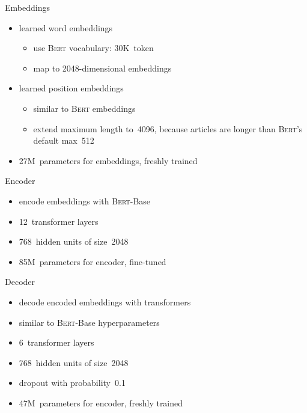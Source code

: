 \documentclass[english,handout]{mlutalk}
\newcommand{\Bert}{\textsc{Bert}\xspace}
\newcommand{\BertBase}{\textsc{Bert}-Base\xspace}
\begin{document}
\begin{frame}{Embeddings}
    \begin{itemize}
        \item learned word embeddings
        \begin{itemize}
            \item use \Bert vocabulary: 30K~token
            \item map to 2048-dimensional embeddings
        \end{itemize}
        \item learned position embeddings
        \begin{itemize}
            \item similar to \Bert embeddings
            \item extend maximum length to~4096, because articles are longer than \Bert's default max~512
        \end{itemize}
        \item 27M~parameters for embeddings, freshly trained
    \end{itemize}
\end{frame}

\begin{frame}{Encoder}
    \begin{itemize}
        \item encode embeddings with \BertBase~\cite{DevlinCLT2019}
        \item 12~transformer layers
        \item 768~hidden units of size~2048
        \item 85M~parameters for encoder, fine-tuned
    \end{itemize}
\end{frame}

\begin{frame}{Decoder~\cite{LiuL2019}}
    \begin{itemize}
        \item decode encoded embeddings with transformers~\cite{VaswaniSPUJGKP2017}
        \item similar to \BertBase hyperparameters
        \item 6~transformer layers
        \item 768~hidden units of size~2048
        \item dropout with probability~0.1
        \item 47M~parameters for encoder, freshly trained
    \end{itemize}
\end{frame}
\end{document}
